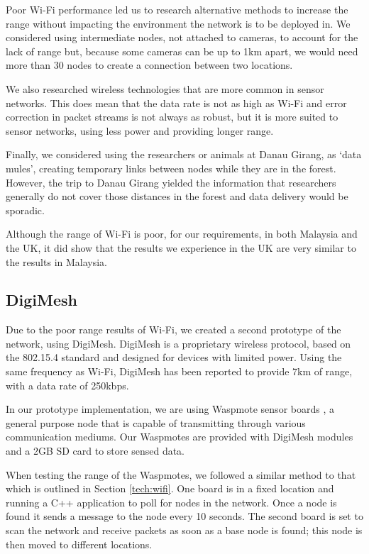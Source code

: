 Poor Wi-Fi performance led us to research alternative methods to increase the range without impacting the environment the network is to be deployed in. We considered using intermediate nodes, not attached to cameras, to account for the lack of range but, because some cameras can be up to 1km apart, we would need more than 30 nodes to create a connection between two locations.
			
We also researched wireless technologies that are more common in sensor networks. This does mean that the data rate is not as high as Wi-Fi and error correction in packet streams is not always as robust, but it is more suited to sensor networks, using less power and providing longer range.
			
Finally, we considered using the researchers or animals at Danau Girang, as `data mules', creating temporary links between nodes while they are in the forest. However, the trip to Danau Girang yielded the information that researchers generally do not cover those distances in the forest and data delivery would be sporadic.
			
Although the range of Wi-Fi is poor, for our requirements, in both Malaysia and the UK, it did show that the results we experience in the UK are very similar to the results in Malaysia.

\subsection{DigiMesh}\label{tech:range:digimesh}
		Due to the poor range results of Wi-Fi, we created a second prototype of the network, using DigiMesh. DigiMesh is a proprietary wireless protocol, based on the 802.15.4 standard and designed for devices with limited power. Using the same frequency as Wi-Fi, DigiMesh has been reported to provide 7km of range, with a data rate of 250kbps.
		
In our prototype implementation, we are using Waspmote sensor boards \cite{waspmote}, a general purpose node that is capable of transmitting through various communication mediums. Our Waspmotes are provided with DigiMesh modules and a 2GB SD card to store sensed data.
		
When testing the range of the Waspmotes, we followed a similar method to that which is outlined in Section \ref{tech:wifi}. One board is in a fixed location and running a C++ application to poll for nodes in the network. Once a node is found it sends a message to the node every 10 seconds. The second board is set to scan the network and receive packets as soon as a base node is found; this node is then moved to different locations.
			
